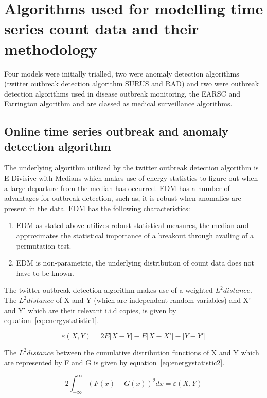 \section{Algorithms used for modelling time series count data and their methodology}

Four models were initially trialled, two were anomaly detection algorithms (twitter outbreak detection algorithm SURUS and RAD) and two were outbreak detection algorithms used in disease outbreak monitoring, the EARSC and Farrington algorithm and are classed as medical surveillance algorithms. 

\subsection{Online time series outbreak and anomaly detection algorithm}
The underlying algorithm utilized by the twitter outbreak detection algorithm \citep{twitterooutbreak} is E-Divisive with Medians \citep{james2014leveraging}  which makes use of energy statistics to figure out when a large departure from the median has occurred. EDM has a number of advantages for outbreak detection, such as, it is robust when anomalies are present in the data. EDM has the following characteristics:
\begin{enumerate}
\item EDM as stated above utilizes robust statistical measures, the median and approximates the statistical importance of a breakout through availing of a permutation test.
\item EDM is non-parametric, the underlying distribution of count data does not have to be known.
\end{enumerate}

The twitter outbreak detection algorithm makes use of a weighted $L^{2} distance$. The $L^{2} distance$  of X and Y (which are independent random variables) and X' and Y' which are their relevant i.i.d copies, is given by equation~\ref{eq:energystatistic1}.

\begin{equation} \varepsilon (X,Y) = 2E|X-Y|-E|X-X'|-|Y-Y'| \label{eq:energystatistic1}  \end{equation} 

The $L^{2} distance$  between the cumulative distribution functions of X and Y which are represented by F and G is given by equation~\ref{eq:energystatistic2}. 

\begin{equation} 
2\int_{-\infty}^{\infty} (F(x)-G(x))^2 dx = \varepsilon (X,Y)
\label{eq:energystatistic2}  \end{equation} 

